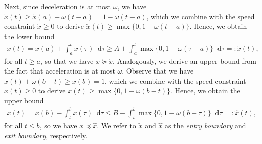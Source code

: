 \documentclass[a4paper]{report}
\theoremstyle{definition}
\theoremstyle{plain}
\newcommand*\diff{\mathop{}\!\mathrm{d}}
\begin{document}
Next, since deceleration is at most $\omega$, we have
$\dot{x}(t) \geq \dot{x}(a) - \omega(t - a) = 1 - \omega(t - a)$, which we
combine with the speed constraint $\dot{x} \geq 0$ to derive
$\dot{x}(t) \geq \max\{0, 1 - \omega (t - a) \}$. Hence, we obtain the lower
bound
\begin{align}\label{eq:check-x}
  x(t) = x(a) + \int_{a}^{t} \dot{x}(\tau) \diff \tau \geq A + \int_{a}^{t} \max\{0, 1 - \omega (\tau - a) \} \diff \tau =: \check{x}(t) ,
\end{align}
for all $t \geq a$, so that we have $x \succeq \check{x}$.
%
Analogously, we derive an upper bound from the fact that acceleration is at most $\bar{\omega}$. Observe that we have
$\dot{x}(t) + \bar{\omega} (b - t) \geq \dot{x}(b) = 1$, which we combine
with the speed constraint $\dot{x}(t) \geq 0$ to derive
$\dot{x}(t) \geq \max \{ 0, 1 - \bar{\omega}(b - t) \}$. Hence, we obtain the
upper bound
\begin{align}\label{eq:hat-x}
  x(t) = x(b) - \int_{t}^{b} \dot{x}(\tau) \diff \tau
  \leq B - \int_{t}^{b} \max\{ 0, 1 -\bar{\omega} (b - \tau) \} \diff \tau =: \hat{x}(t) ,
\end{align}
for all $t \leq b$, so we have $x \preceq \hat{x}$.
%
We refer to $\check{x}$ and $\hat{x}$ as the \emph{entry boundary} and
\emph{exit boundary}, respectively.
\end{document}
